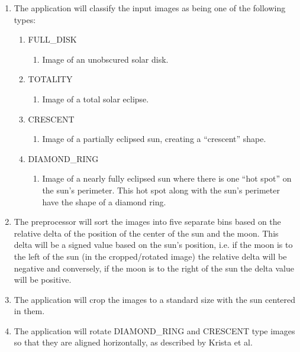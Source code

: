 \documentclass[10pt, onecolumn, draftclsnofoot, letterpaper]{IEEEtran}
\begin{document}
\begin{enumerate}
	\item The application will classify the input images as being 
	one of the following types:
	\begin{enumerate}
		\item FULL\_DISK
		\begin{enumerate}
			\item Image of an unobscured solar disk.
		\end{enumerate}

		\item TOTALITY
		\begin{enumerate}
			\item Image of a total solar eclipse.
		\end{enumerate}

		\item CRESCENT
		\begin{enumerate}
			\item Image of a partially eclipsed sun, creating a 
			“crescent” shape.
		\end{enumerate}

		\item DIAMOND\_RING
		\begin{enumerate}
			\item Image of a nearly fully eclipsed sun where there
			is one “hot spot” on the sun's perimeter. This hot 
			spot along with the sun's perimeter have the shape of
			a diamond ring.
		\end{enumerate}
	\end{enumerate}

	\item The preprocessor will sort the images into five separate 
	bins based on the relative delta of the position of the center 
	of the sun and the moon. This delta will be a signed value 
	based on the sun's position, i.e. if the moon is to the left 
	of the sun (in the cropped/rotated image) the relative delta 
	will be negative and conversely, if the moon is to the right 
	of the sun the delta value will be positive.

	\item The application will crop the images to a standard size 
	with the sun centered in them.

	\item The application will rotate DIAMOND\_RING and CRESCENT 
	type images so that they are aligned horizontally, as 
	described by Krista et al.


\end{enumerate}
\end{document}
